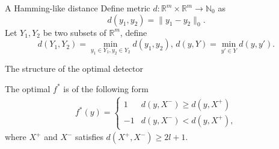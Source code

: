\documentclass[10pt]{beamer}
\begin{document}
\begin{frame}{A Hamming-like distance}
  Define metric $d:\mathbb R^m\times \mathbb R^m\rightarrow \mathbb N_0$ as
  \begin{displaymath}
    d(y_1,y_2)=\|y_1-y_2\|_0. 
  \end{displaymath}
  Let $Y_1,Y_2$ be two subsets of $\mathbb R^m$, define
  \begin{displaymath}
    d(Y_1,Y_2) = \min_{y_1\in Y_1,y_2\in Y_2}d(y_1,y_2),\,d(y,Y) =  \min_{y'\in Y}d(y,y').
  \end{displaymath}

\end{frame}

\begin{frame}{The structure of the optimal detector}
  \begin{theorem}
    The optimal $f^*$ is of the following form
    \begin{align*}
      f^*(y) = \begin{cases}
	1 & d(y,X^-)\ge d(y,X^+)\\
	-1 & d(y,X^-)< d(y,X^+),
      \end{cases}
    \end{align*}
    where $X^{+}$ and $X^{-}$ satisfies $d(X^+,X^-)\geq 2l+1$.
  \end{theorem}
\end{frame}
\end{document}

